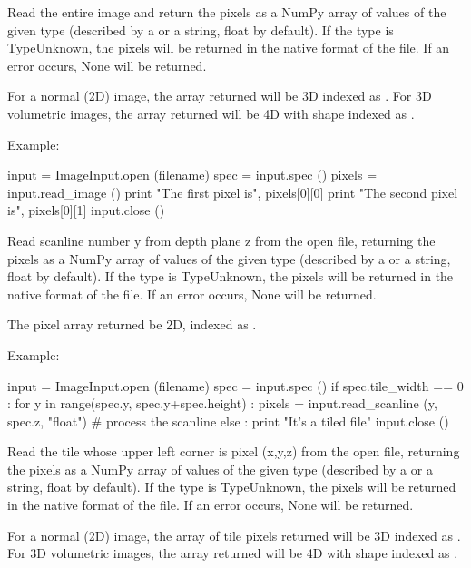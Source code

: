 Read the entire image and return the pixels as a NumPy array of values of
the given {\cf type} (described by a \TypeDesc or a string, float by
default). If the {\cf type} is {\cf TypeUnknown}, the pixels will be
returned in the native format of the file. If an error occurs, {\cf None}
will be returned.

For a normal (2D) image, the array returned will be 3D indexed as
{\cf [y][x][channel]}. For 3D volumetric images, the array returned will be
4D with shape indexed as {\cf [z][y][x][channel]}.

\noindent Example:
\begin{code}
    input = ImageInput.open (filename)
    spec = input.spec ()
    pixels = input.read_image ()
    print "The first pixel is", pixels[0][0]
    print "The second pixel is", pixels[0][1]
    input.close ()
\end{code}
\apiend

Read scanline number {\cf y} from depth plane {\cf z} from the open file,
returning the pixels as a NumPy array of values of
the given {\cf type} (described by a \TypeDesc or a string, float by
default). If the {\cf type} is {\cf TypeUnknown}, the pixels will be
returned in the native format of the file. If an error occurs, {\cf None}
will be returned.

The pixel array returned be 2D, indexed as {\cf [x][channel]}.

\noindent Example:
\begin{code}
    input = ImageInput.open (filename)
    spec = input.spec ()
    if spec.tile_width == 0 :
        for y in range(spec.y, spec.y+spec.height) :
            pixels = input.read_scanline (y, spec.z, "float")
            # process the scanline
    else :
        print "It's a tiled file"
    input.close ()
\end{code}
\apiend

Read the tile whose upper left corner is pixel {\cf (x,y,z)} from the open
file, returning the pixels as a NumPy array of values of
the given {\cf type} (described by a \TypeDesc or a string, float by
default). If the {\cf type} is {\cf TypeUnknown}, the pixels will be
returned in the native format of the file. If an error occurs, {\cf None}
will be returned.

For a normal (2D) image, the array of tile pixels returned will be 3D
indexed as {\cf [y][x][channel]}. For 3D volumetric images, the array
returned will be 4D with shape indexed as {\cf [z][y][x][channel]}.

